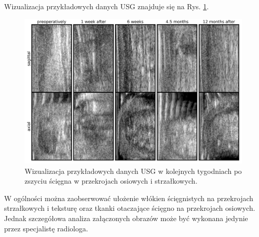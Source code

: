 Wizualizacja przykładowych danych USG znajduje się na Rys. \ref{fig:US_sample}.
\begin{figure}[h!]
	\includegraphics[width=\textwidth]{figures/Data_US_sample.png}
	\caption{Wizualizacja przykładowych danych USG w kolejnych tygodniach po zszyciu ścięgna w przekrojach osiowych i strzałkowych.}
	\label{fig:US_sample}
\end{figure}
W ogólności można zaobserwować ułożenie włókien ścięgnistych na przekrojach strzałkowych i teksturę oraz tkanki otaczające ścięgno na przekrojach osiowych. Jednak szczegółowa analiza załączonych obrazów może być wykonana jedynie przez specjalistę radiologa. 

